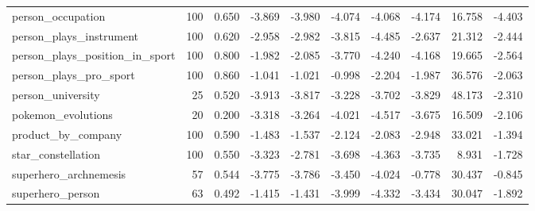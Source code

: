 \begin{table}[htbp]
{\begin{tabular}{lrrrrrrrrr}
person\_occupation & 100 & 0.650 & -3.869 & -3.980 & -4.074 & -4.068 & -4.174 & 16.758 & -4.403 \\
person\_plays\_instrument & 100 & 0.620 & -2.958 & -2.982 & -3.815 & -4.485 & -2.637 & 21.312 & -2.444 \\
person\_plays\_position\_in\_sport & 100 & 0.800 & -1.982 & -2.085 & -3.770 & -4.240 & -4.168 & 19.665 & -2.564 \\
person\_plays\_pro\_sport & 100 & 0.860 & -1.041 & -1.021 & -0.998 & -2.204 & -1.987 & 36.576 & -2.063 \\
person\_university & 25 & 0.520 & -3.913 & -3.817 & -3.228 & -3.702 & -3.829 & 48.173 & -2.310 \\
pokemon\_evolutions & 20 & 0.200 & -3.318 & -3.264 & -4.021 & -4.517 & -3.675 & 16.509 & -2.106 \\
product\_by\_company & 100 & 0.590 & -1.483 & -1.537 & -2.124 & -2.083 & -2.948 & 33.021 & -1.394 \\
star\_constellation & 100 & 0.550 & -3.323 & -2.781 & -3.698 & -4.363 & -3.735 & 8.931 & -1.728 \\
superhero\_archnemesis & 57 & 0.544 & -3.775 & -3.786 & -3.450 & -4.024 & -0.778 & 30.437 & -0.845 \\
superhero\_person & 63 & 0.492 & -1.415 & -1.431 & -3.999 & -4.332 & -3.434 & 30.047 & -1.892 \\
\bottomrule
\end{tabular}}
\end{table}
